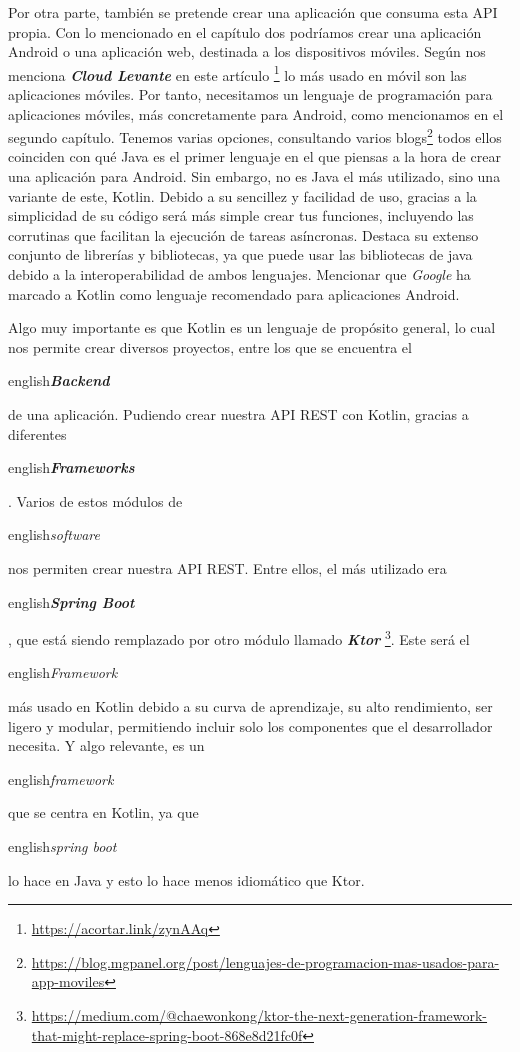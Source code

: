 Por otra parte, también se pretende crear una aplicación que consuma esta API propia. Con lo mencionado 
en el capítulo dos podríamos crear una aplicación Android o una aplicación web, destinada a los 
dispositivos móviles. Según nos menciona \textbf{\textit{Cloud Levante}} en este artículo 
\footnote{\url{https://acortar.link/zynAAq}} lo más usado en móvil son las aplicaciones móviles. Por 
tanto, necesitamos un lenguaje de programación para aplicaciones móviles, más concretamente para 
Android, como mencionamos en el segundo capítulo. Tenemos varias opciones, consultando varios 
blogs\footnote{\url{https://blog.mgpanel.org/post/lenguajes-de-programacion-mas-usados-para-app-moviles}} todos ellos coinciden con qué Java es el primer lenguaje en el que piensas a la hora de crear 
una aplicación para Android. Sin embargo, no es Java el más utilizado, sino una variante de este, 
Kotlin. Debido a su sencillez y facilidad de uso, gracias a la simplicidad de su código será más simple 
crear tus funciones, incluyendo las corrutinas que facilitan la ejecución de tareas asíncronas. Destaca 
su extenso conjunto de librerías y bibliotecas, ya que puede usar las bibliotecas de java debido a la 
interoperabilidad de ambos lenguajes. Mencionar que \textit{Google} ha marcado a Kotlin como lenguaje 
recomendado para aplicaciones Android.

Algo muy importante es que Kotlin es un lenguaje de propósito general, lo cual nos permite crear 
diversos proyectos, entre los que se encuentra el \begin{otherlanguage}
{english}\textit{\textbf{Backend}}\end{otherlanguage} de una aplicación. Pudiendo crear nuestra API 
REST con Kotlin, gracias a diferentes \begin{otherlanguage}
{english}\textit{\textbf{Frameworks}}\end{otherlanguage} \cite{FrameWrk}. Varios de estos módulos de 
\begin{otherlanguage} {english}\textit{software}\end{otherlanguage} nos permiten crear nuestra API 
REST. Entre ellos, el más utilizado era \begin{otherlanguage}
{english}\textbf{\textit{Spring Boot}}\end{otherlanguage}, que está siendo remplazado por otro módulo 
llamado \textbf{\textit{Ktor}} \footnote{\url{https://medium.com/@chaewonkong/ktor-the-next-generation-framework-that-might-replace-spring-boot-868e8d21fc0f}}. Este será el \begin{otherlanguage}
{english}\textit{Framework}\end{otherlanguage} más usado en Kotlin debido a su curva de aprendizaje, su 
alto rendimiento, ser ligero y modular, permitiendo incluir solo los componentes que el desarrollador 
necesita. Y algo relevante, es un \begin{otherlanguage}
{english}\textit{framework}\end{otherlanguage} que se centra en Kotlin, ya que \begin{otherlanguage}
{english}\textit{spring boot}\end{otherlanguage} lo hace en Java y esto lo hace menos idiomático que 
Ktor.

